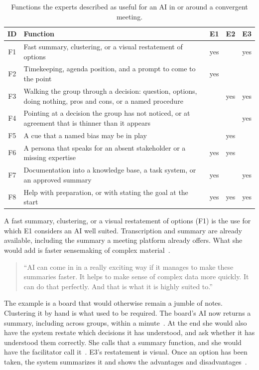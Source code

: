 \begin{table}[htbp]
  \centering
  \caption{Functions the experts described as useful for an AI in or around a convergent
  meeting.}
  \label{tab:interview-ai-functions}
  \footnotesize
  \begin{tabularx}{\textwidth}{@{}c>{\RaggedRight\arraybackslash}Xccc@{}}
    \toprule
    ID & Function & E1 & E2 & E3 \\
    \midrule
    F1 & Fast summary, clustering, or a visual restatement of options & yes &     & yes \\
    F2 & Timekeeping, agenda position, and a prompt to come to the point & yes &     &     \\
    F3 & Walking the group through a decision: question, options, doing nothing,
    pros and cons, or a named procedure &     & yes & yes \\
    F4 & Pointing at a decision the group has not noticed, or at agreement that is
    thinner than it appears &     &     & yes \\
    F5 & A cue that a named bias may be in play &     & yes &     \\
    F6 & A persona that speaks for an absent stakeholder or a missing expertise & yes & yes &     \\
    F7 & Documentation into a knowledge base, a task system, or an approved summary & yes &     & yes \\
    F8 & Help with preparation, or with stating the goal at the start & yes & yes & yes \\
    \bottomrule
  \end{tabularx}
\end{table}

A fast summary, clustering, or a visual restatement of options (F1) is the use for which E1
considers an AI well suited.
Transcription and summary are already available, including the summary a meeting platform
already offers.
What she would add is faster sensemaking of complex material~.
{\setlength{\topsep}{0.25\baselineskip}\setlength{\partopsep}{0pt}%
  \begin{quote}\small
    \enquote{AI can come in in a really exciting way if it manages to make these summaries faster.
      It helps to make sense of complex data more quickly. It can do that perfectly. And that is
    what it is highly suited to.}~
\end{quote}}
The example is a board that would otherwise remain a jumble of notes.
Clustering it by hand is what used to be required.
The board's AI now returns a summary, including across groups, within a
minute~.
At the end she would also have the system restate which decisions it has understood, and ask
whether it has understood them correctly.
She calls that a summary function, and she would have the facilitator call it~.
E3's restatement is visual.
Once an option has been taken, the system summarizes it and shows the advantages and
disadvantages~.


